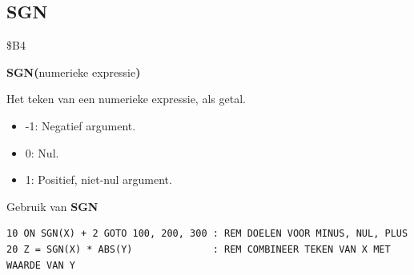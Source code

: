 \subsection{SGN}
\begin{description}[leftmargin=2cm,style=nextline]
\item [Token:]    \$B4

\item [Formaat:]   {\bf SGN(}numerieke expressie{\bf)}

\item [Retourneert:]  Het teken van een numerieke expressie, als getal.

                  \begin{itemize}
                     \item -1: Negatief argument.                     \item 0: Nul.                     \item 1: Positief, niet-nul argument.
                  \end{itemize}

\item [Voorbeeld:]  Gebruik van {\bf SGN}

\begin{tcolorbox}[colback=black,coltext=white]
\verbatimfont{\codefont}
\begin{verbatim}
10 ON SGN(X) + 2 GOTO 100, 200, 300 : REM DOELEN VOOR MINUS, NUL, PLUS
20 Z = SGN(X) * ABS(Y)              : REM COMBINEER TEKEN VAN X MET WAARDE VAN Y
\end{verbatim}
\end{tcolorbox}
\end{description}


\newpage
